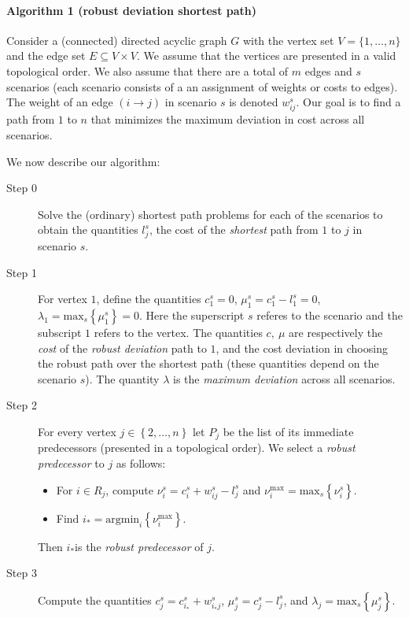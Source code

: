 %

\paragraph{Algorithm 1 (robust deviation shortest path)}

Consider a (connected) directed acyclic graph $G$ with the vertex set $V = \{1, \dots, n\}$ and the edge set $E \subseteq V \times V$. We assume that the vertices are presented in a valid topological order. We also assume that there are a total of $m$ edges and $s$ scenarios (each scenario consists of a an assignment of weights or costs to edges). The weight of an edge $(i \rightarrow j)$ in scenario $s$ is denoted $w^s_{ij}$. Our goal is to find a path from $1$ to $n$ that minimizes the maximum deviation in cost across all scenarios.\cite{some_refs}

We now describe our algorithm:

\begin{description}
\item[Step 0] Solve the (ordinary) shortest path problems for each of the scenarios to obtain the quantities $l^s_j$, the cost of the \emph{shortest} path from $1$ to $j$ in scenario $s$.
\item[Step 1] For vertex $1$, define the quantities $c^s_1 = 0$, $\mu^s_1 = c^s_1 - l^s_1 = 0$, $\lambda_1 = \textrm{max}_s\left\{\mu^s_1\right\} = 0$. Here the superscript $s$ referes to the scenario and the subscript $1$ refers to the vertex. The quantities $c, ~\mu$ are respectively the \textit{cost} of the \emph{robust deviation} path to $1$,  and the cost deviation in choosing the robust path over the shortest path (these quantities depend on the scenario $s$). The quantity $\lambda$ is the \emph{maximum deviation} across all scenarios. 
\item[Step 2] For every vertex $j \in \left\{2,\dots, n\right\}$ let $P_j$ be the list of its immediate predecessors (presented in a topological order). We select a \emph{robust predecessor} to $j$ as follows:
	\begin{itemize}
		\item For $i \in R_j$, compute $\nu^s_i = c^s_i + w^s_{ij} - l^s_j$ and $\nu^{\textrm{max}}_i = \textrm{max}_s\left\{\nu^s_i\right\}$.
		\item Find $i_* = \textrm{argmin}_i\left\{\nu^{\textrm{max}}_i\right\}$.
	\end{itemize}
	Then $i_*$is the \emph{robust predecessor} of $j$.
\item[Step 3] Compute the quantities $c^s_j = c^s_{i_*} + w^s_{i_*j}$, $\mu^s_j = c^s_j - l^s_j$, and $\lambda_j = \textrm{max}_s\left\{\mu^s_j\right\}$.
\end{description}

